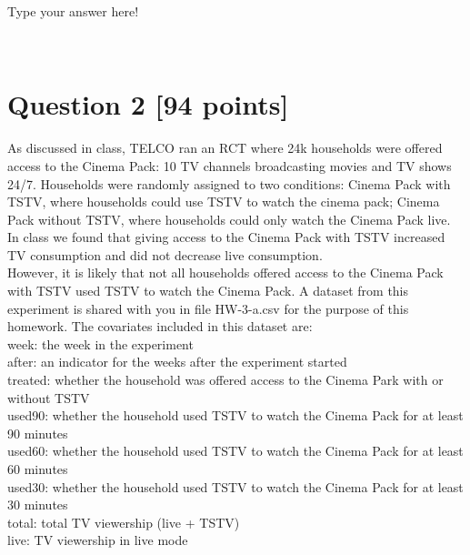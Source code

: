 \documentclass{article}
\begin{document}
\vspace{1cm}

{\color{blue}

Type your answer here!
}\\

\section*{\color{black} Question 2 {\bf [94 points]}}

As discussed in class, TELCO ran an RCT where 24k households were offered access to the Cinema Pack: 10 TV channels broadcasting movies and TV shows 24/7. Households were randomly assigned to two conditions: Cinema Pack with TSTV, where households could use TSTV to watch the cinema pack; Cinema Pack without TSTV, where households could only watch the Cinema Pack live. In class we found that giving access to the Cinema Pack with TSTV increased TV consumption and did not decrease live consumption.\\

However, it is likely that not all households offered access to the Cinema Pack with TSTV used TSTV to watch the Cinema Pack. A dataset from this experiment is shared with you in file HW-3-a.csv for the purpose of this homework. The covariates included in this dataset are:\\

week: the week in the experiment\\

after: an indicator for the weeks after the experiment started\\

treated: whether the household was offered access to the Cinema Park with or without TSTV\\

used90: whether the household used TSTV to watch the Cinema Pack for at least 90 minutes\\

used60: whether the household used TSTV to watch the Cinema Pack for at least 60 minutes\\

used30: whether the household used TSTV to watch the Cinema Pack for at least 30 minutes\\

total: total TV viewership (live + TSTV)\\

live: TV viewership in live mode\\
\end{document}
